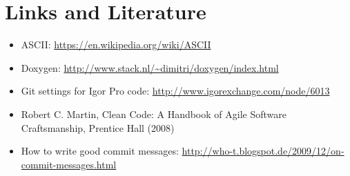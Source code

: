 \documentclass{scrartcl}
\begin{document}
\section{Links and Literature}
%
\begin{itemize}
	\item ASCII: \url{https://en.wikipedia.org/wiki/ASCII}
%	
	\item Doxygen: \url{http://www.stack.nl/~dimitri/doxygen/index.html}
%	
	\item Git settings for Igor Pro code: \url{http://www.igorexchange.com/node/6013}
%	
	\item Robert C. Martin, Clean Code: A Handbook of Agile Software Craftsmanship, Prentice Hall (2008)
%	
	\item How to write good commit messages: \url{http://who-t.blogspot.de/2009/12/on-commit-messages.html}
\end{itemize}
%	
\end{document}
